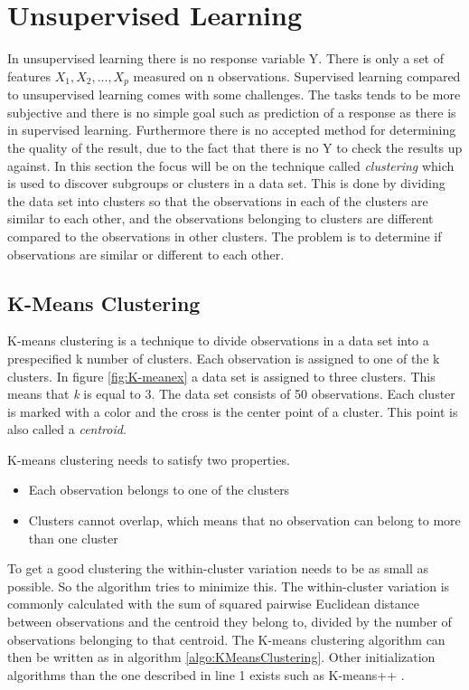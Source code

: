 \chapter{Unsupervised Learning}
\label{chp:unsuplea}
In unsupervised learning there is no response variable Y. There is only a set of features $X_1, X_2,..., X_p$ measured on n observations. 
Supervised learning compared to unsupervised learning comes with some challenges. The tasks tends to be more subjective and there is no simple goal such as prediction of a response as there is in supervised learning. Furthermore there is no accepted method for determining the quality of the result, due to the fact that there is no Y to check the results up against.
In this section the focus will be on the  technique called \emph{clustering} which is used to discover subgroups or clusters in a data set. 
This is done by dividing the data set into clusters so that the observations in each of the clusters are similar to each other, and the observations belonging to clusters are different compared to the observations in other clusters.
The problem is to determine if observations are similar or different to each other.
 
\section{K-Means Clustering}
\label{chp:clus}
K-means clustering is a technique to divide observations in a data set into a prespecified k number of clusters. Each observation is assigned to one of the k clusters. In figure \ref{fig:K-meanex} a data set is assigned to three clusters. This means that \emph{k} is equal to 3. The data set consists of 50 observations. Each cluster is marked with a color and the cross is the center point of a cluster. This point is also called a \emph{centroid}.


K-means clustering needs to satisfy two properties. 
\begin{itemize}
	\item Each observation belongs to one of the clusters
	\item Clusters cannot overlap, which means that no observation can belong to more than one cluster
\end{itemize} 

To get a good clustering the within-cluster variation needs to be as small as possible. So the algorithm tries to minimize this. The within-cluster variation is commonly calculated with the sum of squared pairwise Euclidean distance between observations and the centroid they belong to, divided by the number of observations belonging to that centroid. 
The K-means clustering algorithm can then be written as in algorithm \ref{algo:KMeansClustering}. Other initialization algorithms than the one described in line 1 exists such as K-means++ \citep{kplusplus}.

